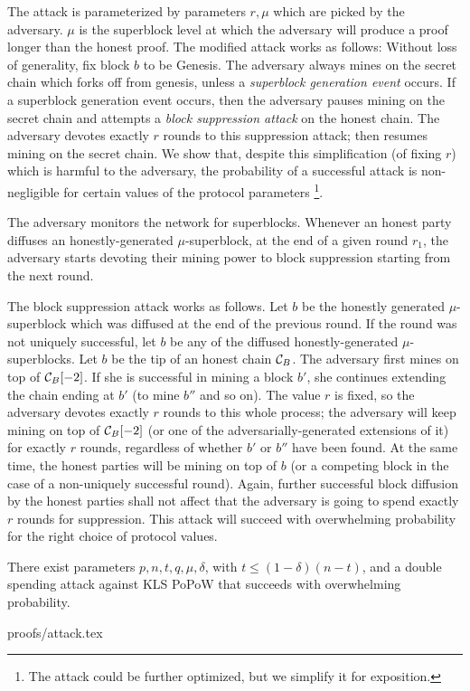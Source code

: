 The attack is parameterized by  parameters $r, \mu$ which are picked by the
adversary. $\mu$ is the superblock level at which the adversary will produce a
proof longer than the honest proof. The modified attack works as follows:
Without loss of generality, fix block $b$ to be Genesis. The adversary always
mines on the secret chain which forks off from genesis, unless a
\textit{superblock generation event} occurs. If a superblock generation event
occurs, then the adversary pauses mining on the secret chain and attempts a
\textit{block suppression attack} on the honest chain. The adversary devotes
exactly $r$ rounds to this suppression attack; then resumes mining on the secret
chain. We show that, despite this simplification (of fixing $r$) which is
harmful to the adversary, the probability of a successful attack is
non-negligible for certain values of the protocol parameters
\footnote{The attack could be further optimized, but we simplify it for
exposition.}.

The adversary monitors the network for superblocks. Whenever an honest party
diffuses an honestly-generated $\mu$-superblock,
at the end of a given round $r_1$, the adversary starts devoting their mining
power to block suppression starting from the next round.

The block suppression attack works as follows. Let $b$ be the honestly generated
$\mu$-superblock which was diffused at the end of the previous round. If the
round was not uniquely successful, let $b$ be any of the diffused
honestly-generated $\mu$-superblocks. Let $b$ be the tip of an honest chain
$\mathcal{C}_B$. The adversary first mines on top of $\mathcal{C}_B[-2]$. If she is
successful in mining a block $b'$, she continues extending the chain ending
at $b'$ (to mine $b''$ and so on). The value $r$ is fixed, so the adversary
devotes exactly $r$ rounds to this whole process; the adversary will keep mining
on top of $\mathcal{C}_B[-2]$ (or one of the adversarially-generated extensions of
it) for exactly $r$ rounds, regardless of whether $b'$ or $b''$ have been found.
At the same time, the honest parties will be mining on top of $b$ (or a
competing block in the case of a non-uniquely successful round). Again, further
successful block diffusion by the honest parties shall not affect that the
adversary is going to spend exactly $r$ rounds for suppression.
This attack will succeed with overwhelming probability for the right choice
of protocol values.

\begin{theorem}
There exist parameters $p, n, t, q,  \mu, \delta$, with $t\leq (1-\delta)(n-t)$,
and a double spending attack against KLS PoPoW that succeeds with overwhelming
probability.
\end{theorem}
{proofs/attack.tex}

